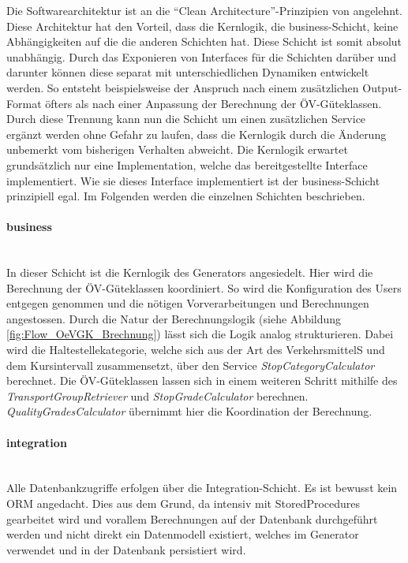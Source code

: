 Die Softwarearchitektur ist an die "`Clean Architecture"'-Prinzipien von \cite{martin_clean_architecture} angelehnt.
Diese Architektur hat den Vorteil, dass die Kernlogik, die business-Schicht, keine Abhängigkeiten auf die die anderen Schichten hat.
Diese Schicht ist somit absolut unabhängig.
Durch das Exponieren von Interfaces für die Schichten darüber und darunter können diese separat mit unterschiedlichen Dynamiken entwickelt werden.
So entsteht beispielsweise der Anspruch nach einem zusätzlichen Output-Format öfters als nach einer Anpassung der Berechnung der \acs{ÖV}-Güteklassen.
Durch diese Trennung kann nun die Schicht  um einen zusätzlichen Service ergänzt werden ohne Gefahr zu laufen, dass die Kernlogik durch die Änderung unbemerkt vom bisherigen Verhalten abweicht.
Die Kernlogik erwartet grundsätzlich nur eine Implementation, welche das bereitgestellte Interface implementiert.
Wie sie dieses Interface implementiert ist der business-Schicht prinzipiell egal.
Im Folgenden werden die einzelnen Schichten beschrieben.

\paragraph{business}~\\
\label{layer:business}
In dieser Schicht ist die Kernlogik des Generators angesiedelt.
Hier wird die Berechnung der \acs{ÖV}-Güteklassen koordiniert.
So wird die Konfiguration des Users entgegen genommen und die nötigen Vorverarbeitungen und Berechnungen angestossen.
Durch die Natur der Berechnungslogik (siehe Abbildung \ref{fig:Flow_OeVGK_Brechnung}) lässt sich die Logik analog strukturieren.
Dabei wird die Haltestellekategorie, welche sich aus der Art des VerkehrsmittelS und dem Kursintervall zusammensetzt, über den Service \emph{StopCategoryCalculator} berechnet.
Die \acs{ÖV}-Güteklassen lassen sich in einem weiteren Schritt mithilfe des \emph{TransportGroupRetriever} und \emph{StopGradeCalculator} berechnen.
\emph{QualityGradesCalculator} übernimmt hier die Koordination der Berechnung.

\paragraph{integration}~\\
\label{layer:integration}
Alle Datenbankzugriffe erfolgen über die Integration-Schicht.
Es ist bewusst kein \acl{ORM} angedacht.
Dies aus dem Grund, da intensiv mit StoredProcedures gearbeitet wird und vorallem Berechnungen auf der Datenbank durchgeführt werden und nicht direkt ein Datenmodell existiert, welches im Generator verwendet und in der Datenbank persistiert wird.

